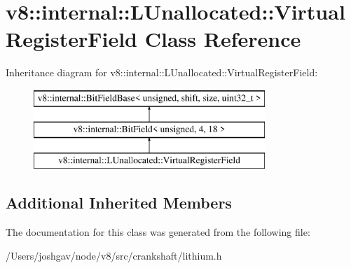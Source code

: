 \hypertarget{classv8_1_1internal_1_1_l_unallocated_1_1_virtual_register_field}{}\section{v8\+:\+:internal\+:\+:L\+Unallocated\+:\+:Virtual\+Register\+Field Class Reference}
\label{classv8_1_1internal_1_1_l_unallocated_1_1_virtual_register_field}
Inheritance diagram for v8\+:\+:internal\+:\+:L\+Unallocated\+:\+:Virtual\+Register\+Field\+:\begin{figure}[H]
\begin{center}
\leavevmode
\includegraphics[height=3.000000cm]{classv8_1_1internal_1_1_l_unallocated_1_1_virtual_register_field}
\end{center}
\end{figure}
\subsection*{Additional Inherited Members}


The documentation for this class was generated from the following file\+:\begin{DoxyCompactItemize}
\item 
/\+Users/joshgav/node/v8/src/crankshaft/lithium.\+h\end{DoxyCompactItemize}
